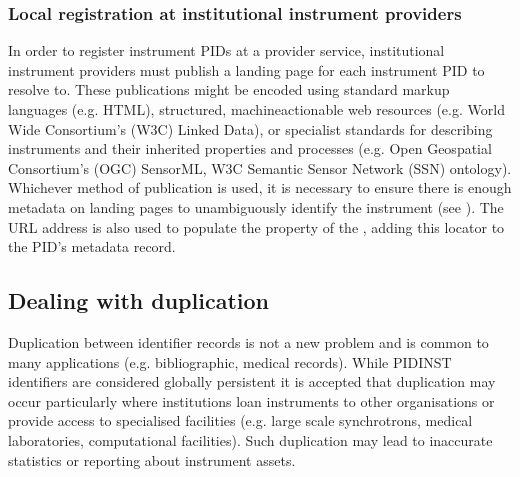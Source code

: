 \documentclass[a4paper,10pt,english]{sphinxmanual}
\begin{document}
\subsubsection{Local registration at institutional instrument providers}
\label{\detokenize{white-paper/registration:local-registration-at-institutional-instrument-providers}}
\sphinxAtStartPar
In order to register instrument PIDs at a provider service,
institutional instrument providers must publish a landing page for each
instrument PID to resolve to. These publications might be encoded using
standard markup languages (e.g. HTML), structured, machine\sphinxhyphen{}actionable
web resources (e.g. World Wide Consortium’s (W3C) Linked Data), or
specialist standards for describing instruments and their inherited
properties and processes (e.g. Open Geospatial Consortium’s (OGC)
SensorML, W3C Semantic Sensor Network (SSN) ontology). Whichever method
of publication is used, it is necessary to ensure there is enough
metadata on landing pages to unambiguously identify the instrument (see
{\hyperref[\detokenize{white-paper/landing-page-content:landing-page-content}]{}}). The URL address is also used to populate
the  property of the , adding this
locator to the PID’s metadata record.


\subsection{Dealing with duplication}
\label{\detokenize{white-paper/duplication:dealing-with-duplication}}\label{\detokenize{white-paper/duplication::doc}}
\sphinxAtStartPar
Duplication between identifier records is not a new problem and is
common to many applications (e.g. bibliographic, medical records).
While PIDINST identifiers are considered globally persistent it is
accepted that duplication may occur particularly where institutions
loan instruments to other organisations or provide access to
specialised facilities (e.g. large scale synchrotrons, medical
laboratories, computational facilities).  Such duplication may lead to
inaccurate statistics or reporting about instrument assets.
\end{document}
